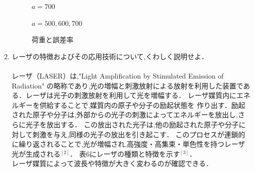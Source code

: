 \documentclass[a4paper,12pt]{jsarticle}
\begin{document}
\begin{enumerate}
\begin{figure}[h]
  \caption{$a = 700$}
\end{figure}
\clearpage
\begin{figure}[h]
  \centering
  \caption{$a = 500,600,700$}
\end{figure}
\clearpage
\begin{figure}[h]
  \centering
  \caption{荷重と誤差率}
\end{figure}
\clearpage
\item レーザの特徴およびその応用技術について,くわしく説明せよ．\\
\\
\quad レーザ（LASER）は,"Light Amplification by Stimulated Emission of Radiation" 
の略称であり,光の増幅と刺激放射による放射を利用した装置である．レーザは光子の刺激放射を利用して光を増幅する．
レーザ媒質内にエネルギーを供給することで,媒質内の原子や分子の励起状態を
作り出す．励起された原子や分子は,外部からの光子の刺激によってエネルギーを放出し,さらに光子を放出する．
この放出された光子は,他の励起された原子や分子に対して刺激を与え,同様の光子の放出を引き起こす．
このプロセスが連鎖的に繰り返されることで,光が増幅され,高強度・高集束・単色性を持つレーザ光が生成される$^{[2]}$．
表6にレーザの種類と特徴を示す$^{[3]}$．\\レーザ媒質によって波長や特徴が大きく変わるのが確認できる．



\end{enumerate}
\end{document}
